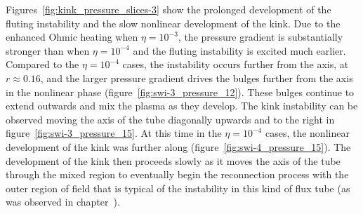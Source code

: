\documentclass[12pt]{article}
\begin{document}
Figures~\ref{fig:kink_pressure_slices-3} show the prolonged development of the fluting instability and the slow nonlinear development of the kink. Due to the enhanced Ohmic heating when $\eta=10^{-3}$, the pressure gradient is substantially stronger than when $\eta=10^{-4}$ and the fluting instability is excited much earlier. Compared to the $\eta=10^{-4}$ cases, the instability occurs further from the axis, at $r\approx0.16$, and the larger pressure gradient drives the bulges further from the axis in the nonlinear phase (figure~\ref{fig:swi-3_pressure_12}). These bulges continue to extend outwards and mix the plasma as they develop. The kink instability can be observed moving the axis of the tube diagonally upwards and to the right in figure~\ref{fig:swi-3_pressure_15}. At this time in the $\eta=10^{-4}$ cases, the nonlinear development of the kink was further along (figure~\ref{fig:swi-4_pressure_15}). The development of the kink then proceeds slowly as it moves the axis of the tube through the mixed region to eventually begin the reconnection process with the outer region of field that is typical of the instability in this kind of flux tube (as was observed in chapter~\cite{quinnEffectAnisotropicViscosity2020a}).
\end{document}
